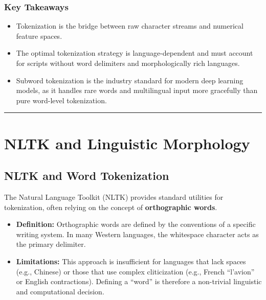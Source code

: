 \documentclass[
  italian,
  11pt,
]{article}
\providecommand{\tightlist}{%
  \setlength{\itemsep}{0pt}\setlength{\parskip}{0pt}}
\begin{document}
\subsubsection{Key Takeaways}\label{key-takeaways-1}

\begin{itemize}
\tightlist
\item
  Tokenization is the bridge between raw character streams and numerical
  feature spaces.
\item
  The optimal tokenization strategy is language-dependent and must
  account for scripts without word delimiters and morphologically rich
  languages.
\item
  Subword tokenization is the industry standard for modern deep learning
  models, as it handles rare words and multilingual input more
  gracefully than pure word-level tokenization.
\end{itemize}

\begin{center}\rule{0.5\linewidth}{0.5pt}\end{center}

\section{NLTK and Linguistic
Morphology}\label{nltk-and-linguistic-morphology}

\subsection{NLTK and Word
Tokenization}\label{nltk-and-word-tokenization}

The Natural Language Toolkit (NLTK) provides standard utilities for
tokenization, often relying on the concept of \textbf{orthographic
words}.

\begin{itemize}
\tightlist
\item
  \textbf{Definition:} Orthographic words are defined by the conventions
  of a specific writing system. In many Western languages, the
  whitespace character acts as the primary delimiter.
\item
  \textbf{Limitations:} This approach is insufficient for languages that
  lack spaces (e.g., Chinese) or those that use complex cliticization
  (e.g., French ``l'avion'' or English contractions). Defining a
  ``word'' is therefore a non-trivial linguistic and computational
  decision.
\end{itemize}
\end{document}
